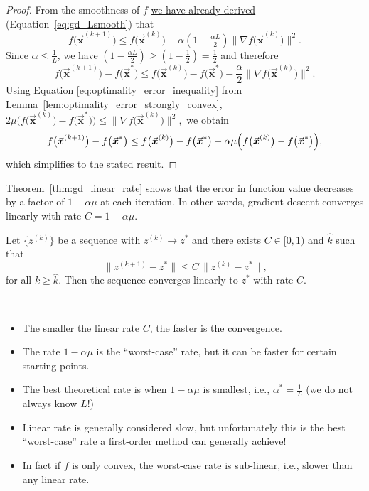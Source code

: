 \documentclass[9pt, headings=standardclasses, parskip=half]{scrartcl}
\renewcommand{\emph}[1]{\textcolor{mypurple}{#1}}
\newcommand{\vect}[1]{\vec{\boldsymbol{#1}}}
\begin{document}
\begin{proof}
From the smoothness of \(f\) \hyperref[eq:gd_Lsmooth]{we have already derived} (Equation~\ref{eq:gd_Lsmooth}) that
\[
f\bigl(\vect{x}^{(k+1)}\bigr)\le f\bigl(\vect{x}^{(k)}\bigr)
-\alpha\left(1-\tfrac{\alpha L}{2}\right)\|\nabla f\bigl(\vect{x}^{(k)}\bigr)\|^{2}.
\]
Since \(\alpha \le \frac{1}{L}\), we have \(\left(1-\frac{\alpha L}{2}\right)\ge\left(1-\frac{1}{2}\right)=\frac{1}{2}\) and therefore
\[
f\bigl(\vect{x}^{(k+1)}\bigr)-f\bigl(\vect{x}^{*}\bigr)
\le f\bigl(\vect{x}^{(k)}\bigr)-f\bigl(\vect{x}^{*}\bigr)
-\frac{\alpha}{2}\|\nabla f\bigl(\vect{x}^{(k)}\bigr)\|^{2}.
\]
Using Equation \eqref{eq:optimality_error_inequality} from Lemma~\ref{lem:optimality_error_strongly_convex},
\(
2\mu\bigl(f\bigl(\vect{x}^{(k)}\bigr)-f\bigl(\vect{x}^{*}\bigr)\bigr)
\le\|\nabla f\bigl(\vect{x}^{(k)}\bigr)\|^{2},
\)
we obtain
\[
f\bigl(\vect{x}^{(k+1)}\bigr)-f\bigl(\vect{x}^{*}\bigr)
\le f\bigl(\vect{x}^{(k)}\bigr)-f\bigl(\vect{x}^{*}\bigr)
-\alpha\mu\Bigl(f\bigl(\vect{x}^{(k)}\bigr)-f\bigl(\vect{x}^{*}\bigr)\Bigr),
\]
which simplifies to the stated result.
\end{proof}

Theorem~\ref{thm:gd_linear_rate} shows that the error in function value decreases by a factor of \(1-\alpha\mu\) at each iteration. In other words, gradient descent converges \emph{linearly} with rate \(C=1-\alpha\mu\).

\begin{definition}
Let \(\{z^{(k)}\}\) be a sequence with \(z^{(k)} \to z^*\) and there exists \(C \in [0,1)\) and \(\hat{k}\) such that
\[
\|z^{(k+1)}-z^{*}\|\le C\,\|z^{(k)}-z^{*}\|\text{,}
\]
for all \(k\ge \hat{k}\). Then the sequence converges \emph{linearly} to \(z^*\) with rate \(C\).
\end{definition}


\begin{remark}\
\begin{itemize}
\item The smaller the linear rate \(C\), the faster is the convergence.
\item The rate \(1-\alpha \mu\) is the ``worst-case'' rate, but it can be faster for certain starting points.
\item The best theoretical rate is when \(1-\alpha \mu\) is smallest, i.e., \(\alpha^{*}=\frac{1}{L}\) (we do not always know \(L\)!)
\item Linear rate is generally considered slow, but unfortunately this is the best ``worst-case'' rate a first-order method can generally achieve!
\item In fact if \(f\) is only convex, the worst-case rate is sub-linear, i.e., slower than any linear rate.
\end{itemize}
\end{remark}
\end{document}
